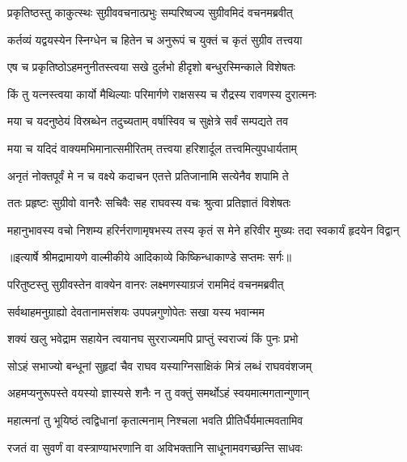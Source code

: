 \twolineshloka
{प्रकृतिष्ठस्तु काकुत्स्थः सुग्रीववचनात्प्रभुः}
{सम्परिष्वज्य सुग्रीवमिदं वचनमब्रवीत्} %

\twolineshloka
{कर्तव्यं यद्वयस्येन स्निग्धेन च हितेन च}
{अनुरूपं च युक्तं च कृतं सुग्रीव तत्त्वया} %

\twolineshloka
{एष च प्रकृतिष्ठोऽहमनुनीतस्त्वया सखे}
{दुर्लभो हीदृशो बन्धुरस्मिन्काले विशेषतः} %

\twolineshloka
{किं तु यत्नस्त्वया कार्यो मैथिल्याः परिमार्गणे}
{राक्षसस्य च रौद्रस्य रावणस्य दुरात्मनः} %

\twolineshloka
{मया च यदनुष्ठेयं विस्रब्धेन तदुच्यताम्}
{वर्षास्विव च सुक्षेत्रे सर्वं सम्पद्यते तव} %

\twolineshloka
{मया च यदिदं वाक्यमभिमानात्समीरितम्}
{तत्त्वया हरिशार्दूल तत्त्वमित्युपधार्यताम्} %

\twolineshloka
{अनृतं नोक्तपूर्वं मे न च वक्ष्ये कदाचन}
{एतत्ते प्रतिजानामि सत्येनैव शपामि ते} %

\twolineshloka
{ततः प्रहृष्टः सुग्रीवो वानरैः सचिवैः सह}
{राघवस्य वचः श्रुत्वा प्रतिज्ञातं विशेषतः} %

\fourlineindentedshloka
{महानुभावस्य वचो निशम्य}
{हरिर्नराणामृषभस्य तस्य}
{कृतं स मेने हरिवीर मुख्यः}
{तदा स्वकार्यं हृदयेन विद्वान्} %


{॥इत्यार्षे श्रीमद्रामायणे वाल्मीकीये आदिकाव्ये किष्किन्धाकाण्डे सप्तमः सर्गः॥}


\twolineshloka
{परितुष्टस्तु सुग्रीवस्तेन वाक्येन वानरः}
{लक्ष्मणस्याग्रजं राममिदं वचनमब्रवीत्} %

\twolineshloka
{सर्वथाहमनुग्राह्यो देवतानामसंशयः}
{उपपन्नगुणोपेतः सखा यस्य भवान्मम} %

\twolineshloka
{शक्यं खलु भवेद्राम सहायेन त्वयानघ}
{सुरराज्यमपि प्राप्तुं स्वराज्यं किं पुनः प्रभो} %

\twolineshloka
{सोऽहं सभाज्यो बन्धूनां सुहृदां चैव राघव}
{यस्याग्निसाक्षिकं मित्रं लब्धं राघववंशजम्} %

\twolineshloka
{अहमप्यनुरूपस्ते वयस्यो ज्ञास्यसे शनैः}
{न तु वक्तुं समर्थोऽहं स्वयमात्मगतान्गुणान्} %

\twolineshloka
{महात्मनां तु भूयिष्ठं त्वद्विधानां कृतात्मनाम्}
{निश्चला भवति प्रीतिर्धैर्यमात्मवतामिव} %

\twolineshloka
{रजतं वा सुवर्णं वा वस्त्राण्याभरणानि वा}
{अविभक्तानि साधूनामवगच्छन्ति साधवः} %

